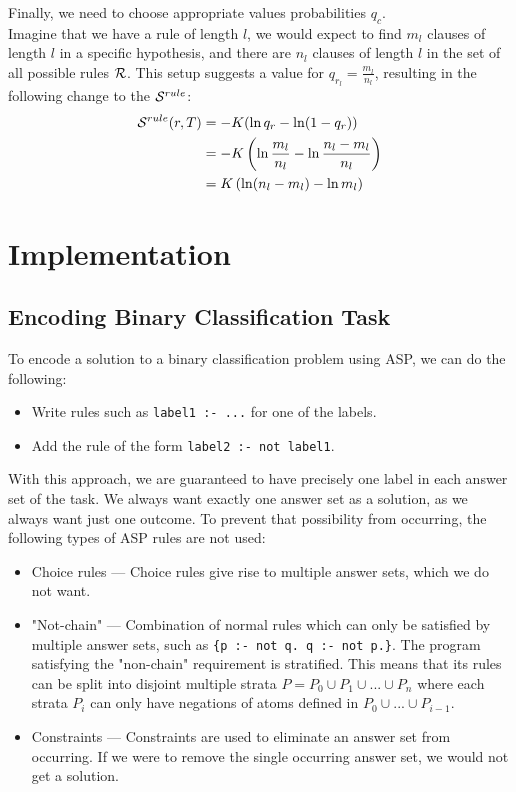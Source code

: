Finally, we need to choose appropriate values probabilities $q_c$. \\
Imagine that we have a rule of length $l$, we would expect to find $m_l$ clauses of length $l$ in a specific hypothesis, and there are $n_l$ clauses of length $l$ in the set of all possible rules $\mathcal{R}$. 
This setup suggests a value for $q_{r_l} = \frac{m_l}{n_l}$, resulting in the following change to the $\mathcal{S}^{rule}$:
\begin{align}
\mathcal{S}^{rule}(r, T) 
& = -K (\ln q_r - \ln(1-q_r)) \nonumber \\
& = -K \left (\ln \frac{m_l}{n_l} - \ln \frac{n_l - m_l}{n_l} \right) \nonumber \\
& = K \left (\ln (n_l - m_l) - \ln m_l  \right)
\end{align}

\section{Implementation}

\subsection{Encoding Binary Classification Task}
\label{encoding-binary-classification-task}

To encode a solution to a binary classification problem using ASP, we can do the following:
\begin{itemize}
    \item Write rules such as \verb+label1 :- ...+  for one of the labels.
    \item Add the rule of the form \verb+label2 :- not label1+.
\end{itemize}

With this approach, we are guaranteed to have precisely one label in each answer set of the task.
We always want exactly one answer set as a solution, as we always want just one outcome.
To prevent that possibility from occurring, the following types of ASP rules are not used:
\begin{itemize}
    \item Choice rules --- Choice rules give rise to multiple answer sets, which we do not want.
    \item "Not-chain" --- Combination of normal rules which can only be satisfied by multiple answer sets, such as \verb+{p :- not q. q :- not p.}+. The program satisfying the "non-chain" requirement is stratified. This means that its rules can be split into disjoint multiple strata $P = P_0 \cup P_1 \cup ... \cup P_n$ where each strata $P_i$ can only have negations of atoms defined in $P_0 \cup ... \cup P_{i-1}$.
    \item Constraints --- Constraints are used to eliminate an answer set from occurring. If we were to remove the single occurring answer set, we would not get a solution.
\end{itemize}

